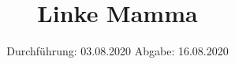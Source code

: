 

\subject{TPS Praktikum}
\title{Linke Mamma}
\date{%
	Durchführung: 03.08.2020
	\hspace{3em}
	Abgabe: 16.08.2020
}


\maketitle
\thispagestyle{empty}
\tableofcontents
\newpage






\printbibliography{}


